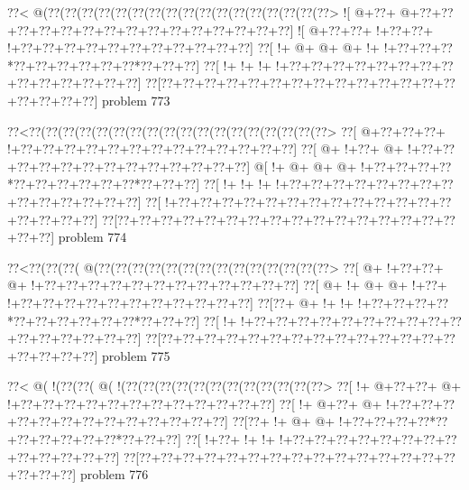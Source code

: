 \vbox{\vbox{\goo
\0??<\- @(\0??(\0??(\0??(\0??(\0??(\0??(\0??(\0??(\0??(\0??(\0??(\0??(\0??(\0??(\0??(\0??(\0??>
\- ![\- @+\0??+\- @+\0??+\0??+\0??+\0??+\0??+\0??+\0??+\0??+\0??+\0??+\0??+\0??+\0??+\0??+\0??]
\- ![\- @+\0??+\0??+\- !+\0??+\0??+\- !+\0??+\0??+\0??+\0??+\0??+\0??+\0??+\0??+\0??+\0??+\0??]
\0??[\- !+\- @+\- @+\- @+\- !+\- !+\0??+\0??+\0??*\0??+\0??+\0??+\0??+\0??+\0??*\0??+\0??+\0??]
\0??[\- !+\- !+\- !+\- !+\0??+\0??+\0??+\0??+\0??+\0??+\0??+\0??+\0??+\0??+\0??+\0??+\0??+\0??]
\0??[\0??+\0??+\0??+\0??+\0??+\0??+\0??+\0??+\0??+\0??+\0??+\0??+\0??+\0??+\0??+\0??+\0??+\0??]
}
\hfil problem 773\hfil\break
}



\vbox{\vbox{\goo
\0??<\0??(\0??(\0??(\0??(\0??(\0??(\0??(\0??(\0??(\0??(\0??(\0??(\0??(\0??(\0??(\0??(\0??(\0??>
\0??[\- @+\0??+\0??+\0??+\- !+\0??+\0??+\0??+\0??+\0??+\0??+\0??+\0??+\0??+\0??+\0??+\0??+\0??]
\0??[\- @+\- !+\0??+\- @+\- !+\0??+\0??+\0??+\0??+\0??+\0??+\0??+\0??+\0??+\0??+\0??+\0??+\0??]
\- @[\- !+\- @+\- @+\- @+\- !+\0??+\0??+\0??+\0??*\0??+\0??+\0??+\0??+\0??+\0??*\0??+\0??+\0??]
\0??[\- !+\- !+\- !+\- !+\0??+\0??+\0??+\0??+\0??+\0??+\0??+\0??+\0??+\0??+\0??+\0??+\0??+\0??]
\0??[\- !+\0??+\0??+\0??+\0??+\0??+\0??+\0??+\0??+\0??+\0??+\0??+\0??+\0??+\0??+\0??+\0??+\0??]
\0??[\0??+\0??+\0??+\0??+\0??+\0??+\0??+\0??+\0??+\0??+\0??+\0??+\0??+\0??+\0??+\0??+\0??+\0??]
}
\hfil problem 774\hfil\break
}



\vbox{\vbox{\goo
\0??<\0??(\0??(\0??(\- @(\0??(\0??(\0??(\0??(\0??(\0??(\0??(\0??(\0??(\0??(\0??(\0??(\0??(\0??>
\0??[\- @+\- !+\0??+\0??+\- @+\- !+\0??+\0??+\0??+\0??+\0??+\0??+\0??+\0??+\0??+\0??+\0??+\0??]
\0??[\- @+\- !+\- @+\- @+\- !+\0??+\- !+\0??+\0??+\0??+\0??+\0??+\0??+\0??+\0??+\0??+\0??+\0??]
\0??[\0??+\- @+\- !+\- !+\- !+\0??+\0??+\0??+\0??*\0??+\0??+\0??+\0??+\0??+\0??*\0??+\0??+\0??]
\0??[\- !+\- !+\0??+\0??+\0??+\0??+\0??+\0??+\0??+\0??+\0??+\0??+\0??+\0??+\0??+\0??+\0??+\0??]
\0??[\0??+\0??+\0??+\0??+\0??+\0??+\0??+\0??+\0??+\0??+\0??+\0??+\0??+\0??+\0??+\0??+\0??+\0??]
}
\hfil problem 775\hfil\break
}



\vbox{\vbox{\goo
\0??<\- @(\- !(\0??(\0??(\- @(\- !(\0??(\0??(\0??(\0??(\0??(\0??(\0??(\0??(\0??(\0??(\0??(\0??>
\0??[\- !+\- @+\0??+\0??+\- @+\- !+\0??+\0??+\0??+\0??+\0??+\0??+\0??+\0??+\0??+\0??+\0??+\0??]
\0??[\- !+\- @+\0??+\- @+\- !+\0??+\0??+\0??+\0??+\0??+\0??+\0??+\0??+\0??+\0??+\0??+\0??+\0??]
\0??[\0??+\- !+\- @+\- @+\- !+\0??+\0??+\0??+\0??*\0??+\0??+\0??+\0??+\0??+\0??*\0??+\0??+\0??]
\0??[\- !+\0??+\- !+\- !+\- !+\0??+\0??+\0??+\0??+\0??+\0??+\0??+\0??+\0??+\0??+\0??+\0??+\0??]
\0??[\0??+\0??+\0??+\0??+\0??+\0??+\0??+\0??+\0??+\0??+\0??+\0??+\0??+\0??+\0??+\0??+\0??+\0??]
}
\hfil problem 776\hfil\break
}



